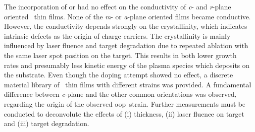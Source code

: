 The incorporation of  or  had no effect on the conductivity of \textit{c}- and \textit{r}-plane oriented \cro\ thin films.
None of the \textit{m}- or \textit{a}-plane oriented films became conductive.
However, the conductivity depends strongly on the crystallinity, which indicates intrinsic defects as the origin of charge carriers.
The crystallinity is mainly influenced by laser fluence and target degradation due to repeated ablation with the same laser spot position on the target.
This results in both lower growth rates and presumably less kinetic energy of the plasma species which deposits on the substrate.
Even though the doping attempt showed no effect, a discrete material library of \cro\ thin films with different strains was provided.
A fundamental difference between \textit{c}-plane and the other common orientations was observed, regarding the origin of the observed \gls{oop}\ strain.
Further measurements must be conducted to deconvolute the effects of (i) thickness, (ii) laser fluence on target and (iii) target degradation.